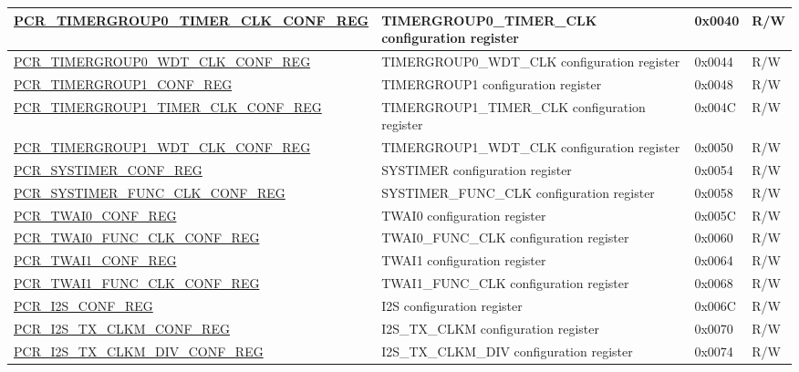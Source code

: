 \begin{longtable}{ | p{6cm} | p{7.2cm} | p{1.3cm} | p{1cm} | }
\hyperref[regdesc:PCRTIMERGROUP0TIMERCLKCONFREG]{PCR\_TIMERGROUP0\_TIMER\_CLK\_\newline CONF\_REG} & TIMERGROUP0\_TIMER\_CLK configuration register & 0x0040 & R/W \\ \hline
\hyperref[regdesc:PCRTIMERGROUP0WDTCLKCONFREG]{PCR\_TIMERGROUP0\_WDT\_CLK\_\newline CONF\_REG} & TIMERGROUP0\_WDT\_CLK configuration register & 0x0044 & R/W \\ \hline
\hyperref[regdesc:PCRTIMERGROUP1CONFREG]{PCR\_TIMERGROUP1\_CONF\_REG} & TIMERGROUP1 configuration register & 0x0048 & R/W \\ \hline
\hyperref[regdesc:PCRTIMERGROUP1TIMERCLKCONFREG]{PCR\_TIMERGROUP1\_TIMER\_CLK\_\newline CONF\_REG} & TIMERGROUP1\_TIMER\_CLK configuration register & 0x004C & R/W \\ \hline
\hyperref[regdesc:PCRTIMERGROUP1WDTCLKCONFREG]{PCR\_TIMERGROUP1\_WDT\_CLK\_\newline CONF\_REG} & TIMERGROUP1\_WDT\_CLK configuration register & 0x0050 & R/W \\ \hline
\hyperref[regdesc:PCRSYSTIMERCONFREG]{PCR\_SYSTIMER\_CONF\_REG} & SYSTIMER configuration register & 0x0054 & R/W \\ \hline
\hyperref[regdesc:PCRSYSTIMERFUNCCLKCONFREG]{PCR\_SYSTIMER\_FUNC\_CLK\_CONF\newline\_REG} & SYSTIMER\_FUNC\_CLK configuration register & 0x0058 & R/W \\ \hline
\hyperref[regdesc:PCRTWAI0CONFREG]{PCR\_TWAI0\_CONF\_REG} & TWAI0 configuration register & 0x005C & R/W \\ \hline
\hyperref[regdesc:PCRTWAI0FUNCCLKCONFREG]{PCR\_TWAI0\_FUNC\_CLK\_CONF\_REG} & TWAI0\_FUNC\_CLK configuration register & 0x0060 & R/W \\ \hline
\hyperref[regdesc:PCRTWAI1CONFREG]{PCR\_TWAI1\_CONF\_REG} & TWAI1 configuration register & 0x0064 & R/W \\ \hline
\hyperref[regdesc:PCRTWAI1FUNCCLKCONFREG]{PCR\_TWAI1\_FUNC\_CLK\_CONF\_REG} & TWAI1\_FUNC\_CLK configuration register & 0x0068 & R/W \\ \hline
\hyperref[regdesc:PCRI2SCONFREG]{PCR\_I2S\_CONF\_REG} & I2S configuration register & 0x006C & R/W \\ \hline
\hyperref[regdesc:PCRI2STXCLKMCONFREG]{PCR\_I2S\_TX\_CLKM\_CONF\_REG} & I2S\_TX\_CLKM configuration register & 0x0070 & R/W \\ \hline
\hyperref[regdesc:PCRI2STXCLKMDIVCONFREG]{PCR\_I2S\_TX\_CLKM\_DIV\_CONF\_REG} & I2S\_TX\_CLKM\_DIV configuration register & 0x0074 & R/W \\ \hline

\end{longtable}
